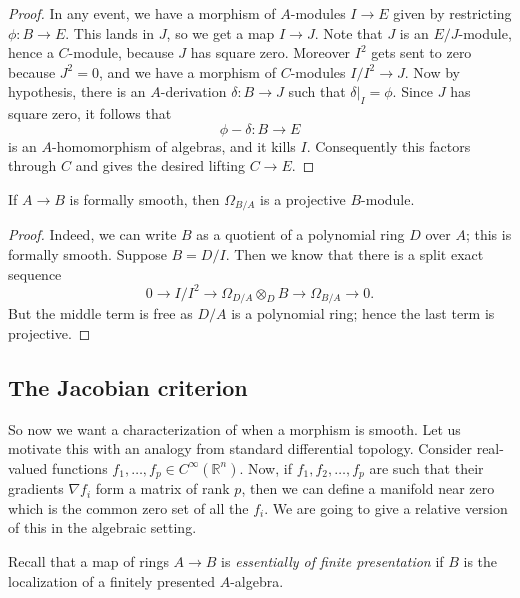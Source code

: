 \begin{proof}
In any event, we have a morphism of $A$-modules
$  I \to E$  given by restricting $\phi: B \to E$.
This lands in $J$, so we get a map $I \to J$. Note that $J$ is an $E/J$-module,
hence a $C$-module, because $J$ has square zero. Moreover $I^2$ gets sent to
zero because $J^2 = 0$, and we have a morphism of
$C$-modules $I/I^2 \to J$.
Now by hypothesis, there is an $A$-derivation
$\delta: B \to J$ such that $\delta|_I = \phi$.
Since $J$ has square zero, it follows that
\[ \phi - \delta: B \to E  \]
is an $A$-homomorphism of algebras, and it kills $I$.
Consequently this factors through $C$ and gives the desired lifting $C \to E$.



\end{proof} 

\begin{corollary} 
If $A \to B$ is formally smooth, then 
$\Omega_{B/A}$ is a projective $B$-module.
\end{corollary} 
\begin{proof} 
Indeed, we can write $B$ as a quotient of a polynomial ring $D$ over $A$; this
is formally smooth. Suppose $B = D/I$.
Then we know that there is a split exact sequence
\[ 0 \to I/I^2 \to \Omega_{D/A} \otimes_D B \to \Omega_{B/A} \to 0.  \]
But the middle term is free as $D/A$ is a polynomial ring; hence the last term
is projective.
\end{proof} 
\subsection{The Jacobian criterion}


So now we want  a characterization of when a morphism is smooth. Let us
motivate this with an analogy from standard differential topology. 
Consider real-valued functions $f_1, \dots, f_p \in C^{\infty}(\mathbb{R}^n)$.
Now, if $f_1, f_2, \dots, f_p$ are such that their gradients $\nabla f_i$ form a
matrix of rank $p$, then we can define a manifold near zero
which is the common zero set of all the $f_i$.
We are going to give a relative version of this in the algebraic setting.



Recall that a map of rings $A \to B$ is \emph{essentially of finite
presentation} if $B$ is the localization of a finitely presented $A$-algebra.


